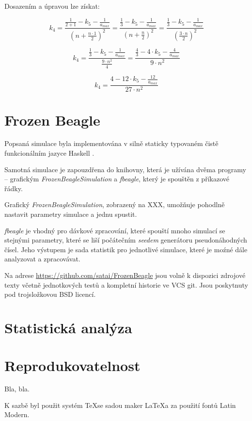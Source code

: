 Dosazením a úpravou lze získat:



\begin{equation}
k_4  = \frac{\frac{1}{2 + 1} -  {k_5} - \frac{1}{a_{max}}}{(n + \frac{n\cdot{}1}{2})^2}
     = \frac{\frac{1}{3} -  {k_5} - \frac{1}{a_{max}}}{(n + \frac{n}{2})^2}
     = \frac{\frac{1}{3} -  {k_5} - \frac{1}{a_{max}}}{(\frac{3\cdot{}n}{2})^2}
\end{equation}

\begin{equation}
k_4  = \frac{\frac{1}{3} -  {k_5} - \frac{1}{a_{max}}}{\frac{9\cdot{}n^2}{4}}
     = \frac{\frac{4}{3} - 4\cdot{}{k_5} - \frac{4}{a_{max}}}{9\cdot{}n^2}
\end{equation}

\begin{equation}
k_4  = \frac{4 - 12\cdot{}{k_5} - \frac{12}{a_{max}}}{27\cdot{}n^2}
\end{equation}

\section{Frozen Beagle}

Popsaná simulace byla implementována v silně staticky typovaném čistě funkcionálním jazyce Haskell \citep{Haskell}.

Samotná simulace je zapouzdřena do knihovny, která je užívána dvěma programy -- grafickým
\textit{FrozenBeagleSimulation} a \textit{fbeagle}, který je spouštěn z příkazové řádky.

Grafický \textit{FrozenBeagleSimulation}, zobrazený na XXX,
umožňuje pohodlně nastavit parametry simulace a jednu spustit.





\textit{fbeagle} je vhodný pro dávkové zpracování, které spouští mnoho simulací se stejnými parametry, které se liší počátečním \textit{seedem} generátoru pseudonáhodných čísel. Jeho výstupem je sada statistik pro jednotlivé simulace, které je moźné dále analyzovat a zpracovávat.

Na adrese \url {https://github.com/satai/FrozenBeagle} jsou volně k dispozici zdrojové texty včetně jednotkových testů a kompletní historie ve VCS git. Jsou poskytnuty pod trojsložkovou BSD licencí.

\section{Statistická analýza}

\section{Reprodukovatelnost}

Bla, bla.

K sazbě byl použit systém \TeX se sadou maker \LaTeX a za použití fontů Latin Modern.
